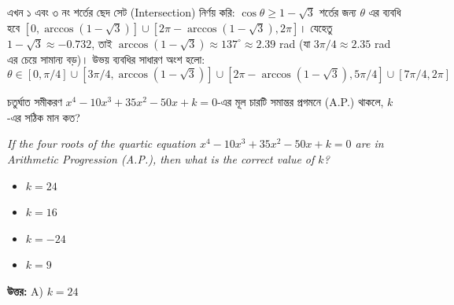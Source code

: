 \documentclass[12pt, a4paper]{article}
\begin{document}
\begin{tcolorbox}[solutionbox={সমাধান (Solution)}]
    \vspace{0.5em}
    এখন ১ এবং ৩ নং শর্তের ছেদ সেট (Intersection) নির্ণয় করি: 
    $\cos\theta \ge 1-\sqrt{3}$ শর্তের জন্য $\theta$ এর ব্যবধি হবে $[0, \arccos(1-\sqrt{3})] \cup [2\pi-\arccos(1-\sqrt{3}), 2\pi]$। 
    যেহেতু $1-\sqrt{3} \approx -0.732$, তাই $\arccos(1-\sqrt{3}) \approx 137^\circ \approx 2.39$ rad (যা $3\pi/4 \approx 2.35$ rad এর চেয়ে সামান্য বড়)। 
    উভয় ব্যবধির সাধারণ অংশ হলো:
    \[ \theta \in [0, \pi/4] \cup [3\pi/4, \arccos(1-\sqrt{3})] \cup [2\pi-\arccos(1-\sqrt{3}), 5\pi/4] \cup [7\pi/4, 2\pi] \]
\end{tcolorbox}

\vspace{1.5em}

\begin{tcolorbox}[questionbox={প্রশ্ন (Question) 43}]
    \noindent
    চতুর্ঘাত সমীকরণ $x^4 - 10x^3 + 35x^2 - 50x + k = 0$-এর মূল চারটি সমান্তর প্রগমনে (A.P.) থাকলে, $k$-এর সঠিক মান কত?
    
    \vspace{0.8em}
    \begin{english}
    \noindent\textit{\color{darkgray}
    If the four roots of the quartic equation $x^4 - 10x^3 + 35x^2 - 50x + k = 0$ are in Arithmetic Progression (A.P.), then what is the correct value of $k$?
    }
    \end{english}
\end{tcolorbox}

\begin{itemize}[label={}, leftmargin=1cm, itemsep=0.5em]
    \item[\textbf{A)}] $k = 24$
    \item[\textbf{B)}] $k = 16$
    \item[\textbf{C)}] $k = -24$
    \item[\textbf{D)}] $k = 9$
\end{itemize}

\vspace{0.5em}
\begin{tcolorbox}[answerbox]
    \textbf{\color{success} উত্তর:} A) $k = 24$
\end{tcolorbox}
\vspace{1em}
\end{document}
